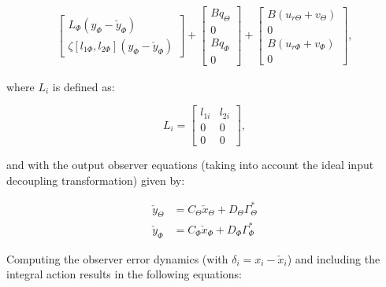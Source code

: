 \documentclass[main.tex]{subfiles}
\begin{document}
\begin{align}
\begin{bmatrix}
	L_{\Phi}(y_{\Phi} - \check{y}_{\Phi}) \\
	\zeta[l_{1\Phi},l_{2{\Phi}}](y_\Phi - \check{y}_\Phi)
	\end{bmatrix} +
	\begin{bmatrix}
		Bq_\Theta \\
		0 \\
		Bq_\Phi \\
		0	
	\end{bmatrix} +
	\begin{bmatrix}
	B(u_{r\Theta} + v_\Theta) \\
	0 \\
	B(u_{r\Phi} + v_\Phi) \\
	0
	\end{bmatrix},
	\end{align}
		
	where $L_i$ is defined as:
	
	\begin{equation}
		L_i = \begin{bmatrix}
		l_{1i} & l_{2i} \\
		0 & 0 \\
		0 & 0 
		\end{bmatrix},
	\end{equation}
	
	and with the output observer equations (taking into account the ideal input decoupling transformation) given by:
		
	\begin{align}
		\check{y}_\Theta &= C_\Theta \check{x}_\Theta + D_\Theta \Gamma_\Theta^* \\
		\check{y}_\Phi &= C_\Phi \check{x}_\Phi + D_\Phi \Gamma_\Phi^*		
	\end{align}
	
	Computing the observer error dynamics (with $\delta_i = x_i - \check{x}_i$) and including the integral action results in the following equations:
	
\end{document}
